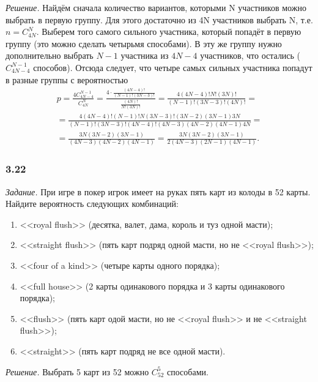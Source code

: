 \textit{Решение.} Найдём сначала количество вариантов, которыми N участников можно выбрать в первую группу.
Для этого достаточно из 4N участников выбрать N, т.е. $ n = C_{4N}^N $.
Выберем того самого сильного участника, который попадёт в первую группу (это можно сделать четырьмя способами).
В эту же группу нужно дополнительно выбрать $ N - 1 $ участника из $ 4N - 4 $ участников, что остались ($ C_{ 4N - 4 }^{ N - 1 } $ способов).
Отсюда следует, что четыре самых сильных участника попадут в разные группы с вероятностью
\begin{equation*}
\begin{split}
p =
\frac{ 4C_{ 4N - 4 }^{ N - 1 } }{ C_{ 4N }^N } =
\frac{ 4 \cdot \frac{ (4N-4)! }{ ( N - 1 )!( 3 N - 3)! } }{ \frac{ (4N)! }{ N!(3N)! } } =
\frac{ 4(4N-4)!N!(3N)! }{ (N-1)!(3N-3)!(4N)! } = \\
= \frac{ 4(4N-4)!(N-1)!N(3N-3)!(3N-2)(3N-1)3N }{ (N-1)!(3N-3)!(4N-4)!(4N-3)(4N-2)(4N-1)4N } = \\
= \frac{ 3N(3N-2)(3N-1) }{ (4N-3)(4N-2)(4N-1) } =
\frac{ 3N(3N-2)(3N-1) }{ 2(4N-3)(2N-1)(4N-1) }.
\end{split}
\end{equation*}

\subsubsection*{3.22}

\textit{Задание.} При игре в покер игрок имеет на руках пять карт из колоды в 52 карты.
Найдите вероятность следующих комбинаций:
\begin{enumerate}[label=\alph*)]
\item <<royal flush>> (десятка, валет, дама, король и туз одной масти);
\item <<straight flush>> (пять карт подряд одной масти, но не <<royal flush>>);
\item <<four of a kind>> (четыре карты одного порядка);
\item <<full house>> (2 карты одинакового порядка и 3 карты одинакового порядка);
\item <<flush>> (пять карт одой масти, но не <<royal flush>> и не <<straight flush>>);
\item <<straight>> (пять карт подряд не все одной масти).
\end{enumerate}

\textit{Решение.} Выбрать 5 карт из 52 можно $ C_{52}^5 $ способами.

